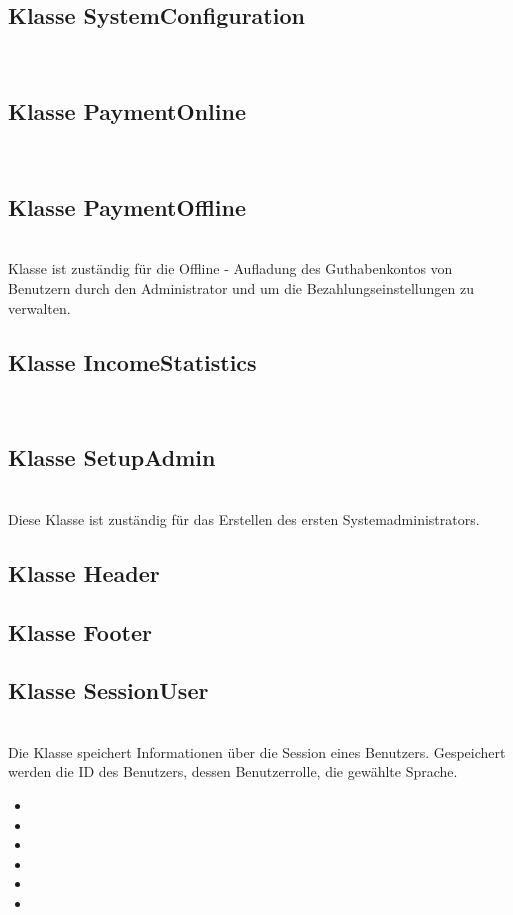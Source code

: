 	\subsection{Klasse SystemConfiguration}
	\\
	\subsection{Klasse PaymentOnline}
	\\
	\subsection{Klasse PaymentOffline}
	\\
	Klasse ist zuständig für die Offline - Aufladung des Guthabenkontos von Benutzern durch den Administrator und um die Bezahlungseinstellungen zu verwalten.
	\subsection{Klasse IncomeStatistics}
	\\
	\subsection{Klasse SetupAdmin}
	\\
	Diese Klasse ist zuständig für das Erstellen des ersten Systemadministrators.
	\subsection{Klasse Header}
	\subsection{Klasse Footer}
	\subsection{Klasse SessionUser}
	\\
	Die Klasse speichert Informationen über die Session eines Benutzers. Gespeichert werden die ID des Benutzers, dessen Benutzerrolle, die gewählte Sprache.
	\begin{itemize}
		\item {}
		\item {}
		\item {}
		\item {}
		\item {}
		\item {}
	\end{itemize}
	
